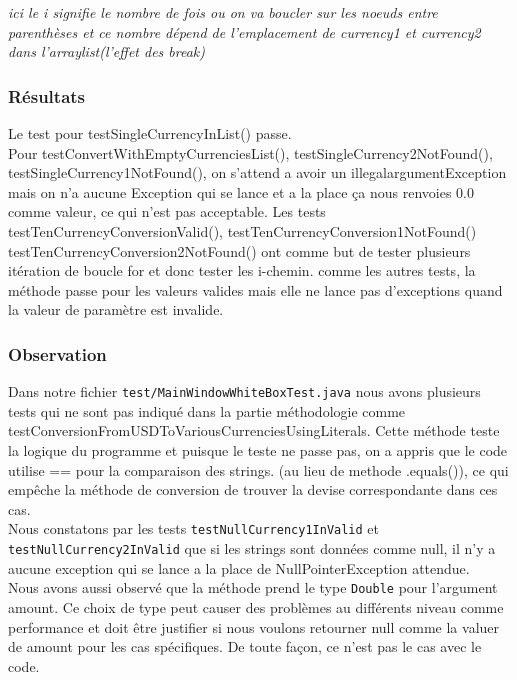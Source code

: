 \documentclass[11pt]{article}
\begin{document}
\textit{ici le i signifie le nombre de fois ou on va boucler sur les noeuds entre parenthèses et ce nombre dépend de l'emplacement de currency1 et currency2 dans l'arraylist(l'effet des break)}

\subsubsection{Résultats}
Le test  pour testSingleCurrencyInList() passe. \\
Pour testConvertWithEmptyCurrenciesList(), testSingleCurrency2NotFound(), testSingleCurrency1NotFound(), on s'attend a avoir un illegalargumentException mais on n'a aucune Exception qui se lance et a la place ça nous renvoies 0.0 comme valeur, ce qui n'est pas acceptable. Les tests testTenCurrencyConversionValid(), testTenCurrencyConversion1NotFound() testTenCurrencyConversion2NotFound() ont comme but de tester plusieurs itération de boucle for et donc tester les i-chemin. comme les autres tests, la méthode passe pour les valeurs valides mais elle ne lance pas d'exceptions quand la valeur de paramètre est invalide.

\subsubsection{Observation}
Dans notre fichier \texttt{test/MainWindowWhiteBoxTest.java} nous avons plusieurs tests qui ne sont pas indiqué dans la partie méthodologie comme testConversionFromUSDToVariousCurrenciesUsingLiterals. Cette méthode teste la logique du programme et puisque le teste ne passe pas, on a appris que le code utilise == pour la comparaison des strings. (au lieu de methode .equals()), ce qui empêche la méthode de conversion de trouver la devise correspondante dans ces cas. \\

Nous constatons par les tests \texttt{testNullCurrency1InValid} et \texttt{testNullCurrency2InValid} que si les strings sont données comme null, il n'y a aucune exception qui se lance a la place de NullPointerException attendue. \\

Nous avons aussi observé que la méthode prend le type \texttt{Double} pour l'argument amount. Ce choix de type peut causer des problèmes au différents niveau comme performance et doit être justifier si nous voulons retourner null comme la valuer de amount pour les cas spécifiques. De toute façon, ce n'est pas le cas avec le code.
\end{document}
